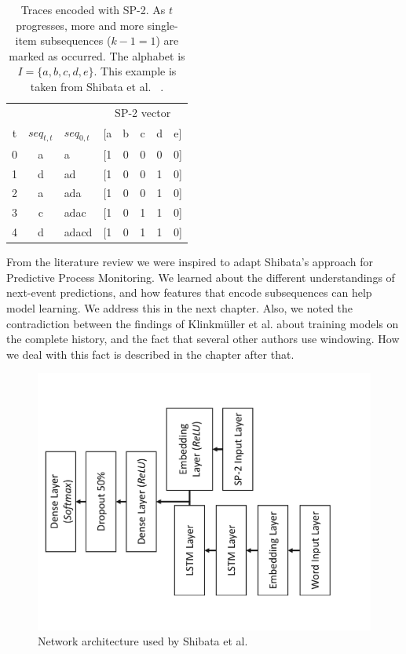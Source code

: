 \begin{table}[!htb]
    \centering
    \begin{tabular}{cclccccc}
          &      &              & \multicolumn{5}{c}{SP-2 vector}\\
        t & $seq_{t, t}$ & $seq_{0,t}$ & [a & b & c & d & e]\\
        \midrule
        0 & a    & a            & [1 & 0 & 0 & 0 & 0]\\
        1 & d    & ad           & [1 & 0 & 0 & 1 & 0]\\
        2 & a    & ada          & [1 & 0 & 0 & 1 & 0]\\
        3 & c    & adac         & [1 & 0 & 1 & 1 & 0]\\
        4 & d    & adacd        & [1 & 0 & 1 & 1 & 0]\\
    \end{tabular}
    \caption[SP-2 feature vector example]{Traces encoded with SP-2. As $t$ progresses, more and more single-item subsequences ($k-1=1$) are marked as occurred. The alphabet is $I=\{a,b,c,d,e\}$. This example is taken from Shibata et al. ~\cite{shibata2016bipartite}.}
    \label{tab:sp2-encoding}
\end{table}


From the literature review we were inspired to adapt Shibata's approach for Predictive Process Monitoring.
We learned about the different understandings of next-event predictions, and how
features that encode subsequences can help model learning. We address this in the next chapter.
Also, we noted the contradiction between the findings of Klinkmüller et al. about training models on the complete history, and the fact that several other authors use windowing.
How we deal with this fact is described in the chapter after that.

\begin{figure}
    \centering
    \includegraphics[width=.8\textwidth,angle=-90,origin=c]{gfx/spice-winner-architecture.pdf}
    \caption{Network architecture used by Shibata et al.}
    \label{fig:spice-winner-architecture}
\end{figure}
